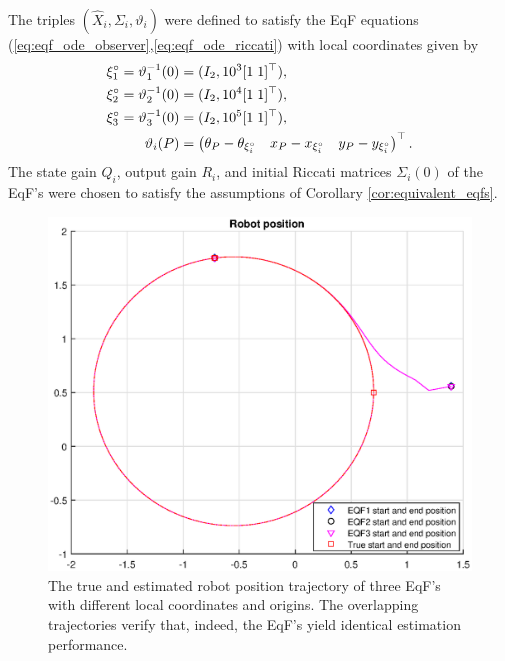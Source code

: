 \documentclass{article}
\newcommand{\figsize}{0.7}
\begin{document}
The triples $(\hat{X}_i, \Sigma_i, \vartheta_i)$ were defined to satisfy the EqF equations (\ref{eq:eqf_ode_observer},\ref{eq:eqf_ode_riccati}) with local coordinates given by
\begin{align*}
    {\xi}^\circ_1 = \vartheta_1^{-1}(0) &= (I_2, 10^3[1 \; 1]^\top), \\
    {\xi}^\circ_2 = \vartheta_2^{-1}(0) &= (I_2, 10^4[1 \; 1]^\top), \\
    {\xi}^\circ_3 = \vartheta_3^{-1}(0) &= (I_2, 10^5[1 \; 1]^\top), \\
    \vartheta_i(P) &= \begin{pmatrix} \theta_P - \theta_{{\xi}^\circ_i} & x_P - x_{{\xi}^\circ_i} & y_P - y_{{\xi}^\circ_i}  \end{pmatrix}^\top.
\end{align*}
The state gain $Q_i$, output gain $R_i$, and initial Riccati matrices $\Sigma_i(0)$ of the EqF's were chosen to satisfy the assumptions of Corollary \ref{cor:equivalent_eqfs}.
 
\begin{figure}[ht]
    \centering
    \includegraphics[width=\figsize\linewidth]{trial2.eps}
    \caption{The true and estimated robot position trajectory of three EqF's with different local coordinates and origins.
    The overlapping trajectories verify that, indeed, the EqF's yield identical estimation performance.}
    \label{fig:trajectories}
\end{figure}
\end{document}
